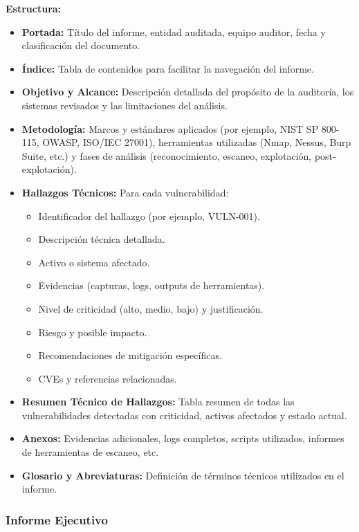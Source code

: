 \documentclass[a4paper, 11pt]{article}
\begin{document}
\textbf{Estructura:}
\begin{itemize}
  \item \textbf{Portada:} Título del informe, entidad auditada, equipo auditor, fecha y clasificación del documento.
  \item \textbf{Índice:} Tabla de contenidos para facilitar la navegación del informe.
  \item \textbf{Objetivo y Alcance:} Descripción detallada del propósito de la auditoría, los sistemas revisados y las limitaciones del análisis.
  \item \textbf{Metodología:} Marcos y estándares aplicados (por ejemplo, NIST SP 800-115, OWASP, ISO/IEC 27001), herramientas utilizadas (Nmap, Nessus, Burp Suite, etc.) y fases de análisis (reconocimiento, escaneo, explotación, post-explotación).
  \item \textbf{Hallazgos Técnicos:} Para cada vulnerabilidad:
  \begin{itemize}
    \item Identificador del hallazgo (por ejemplo, VULN-001).
    \item Descripción técnica detallada.
    \item Activo o sistema afectado.
    \item Evidencias (capturas, logs, outputs de herramientas).
    \item Nivel de criticidad (alto, medio, bajo) y justificación.
    \item Riesgo y posible impacto.
    \item Recomendaciones de mitigación específicas.
    \item CVEs y referencias relacionadas.
  \end{itemize}
  \item \textbf{Resumen Técnico de Hallazgos:} Tabla resumen de todas las vulnerabilidades detectadas con criticidad, activos afectados y estado actual.
  \item \textbf{Anexos:} Evidencias adicionales, logs completos, scripts utilizados, informes de herramientas de escaneo, etc.
  \item \textbf{Glosario y Abreviaturas:} Definición de términos técnicos utilizados en el informe.
\end{itemize}

\vspace{0.5cm}

\subsubsection{Informe Ejecutivo}
\end{document}
